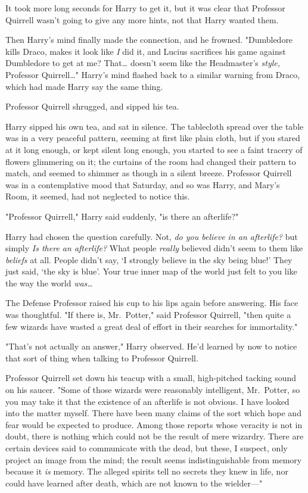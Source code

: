 It took more long seconds for Harry to get it, but it was clear that Professor
Quirrell wasn't going to give any more hints, not that Harry wanted them.

Then Harry's mind finally made the connection, and he frowned. "Dumbledore
kills Draco, makes it look like \emph{I} did it, and Lucius sacrifices his game
against Dumbledore to get at me? That{\ldots} doesn't seem like the
Headmaster's \emph{style,} Professor Quirrell{\ldots}" Harry's mind flashed
back to a similar warning from Draco, which had made Harry say the same thing.

Professor Quirrell shrugged, and sipped his tea.

Harry sipped his own tea, and sat in silence. The tablecloth spread over the
table was in a very peaceful pattern, seeming at first like plain cloth, but if
you stared at it long enough, or kept silent long enough, you started to see a
faint tracery of flowers glimmering on it; the curtains of the room had changed
their pattern to match, and seemed to shimmer as though in a silent breeze.
Professor Quirrell was in a contemplative mood that Saturday, and so was Harry,
and Mary's Room, it seemed, had not neglected to notice this.

"Professor Quirrell," Harry said suddenly, "is there an afterlife?"

Harry had chosen the question carefully. Not, \emph{do you believe in an
afterlife?} but simply \emph{Is there an afterlife?} What people \emph{really}
believed didn't seem to them like \emph{beliefs} at all. People didn't say, `I
strongly believe in the sky being blue!' They just said, `the sky is blue'.
Your true inner map of the world just felt to you like the way the world
\emph{was{\ldots}}

The Defense Professor raised his cup to his lips again before answering. His
face was thoughtful. "If there is, Mr.~Potter," said Professor Quirrell, "then
quite a few wizards have wasted a great deal of effort in their searches for
immortality."

"That's not actually an answer," Harry observed. He'd learned by now to notice
that sort of thing when talking to Professor Quirrell.

Professor Quirrell set down his teacup with a small, high-pitched tacking sound
on his saucer. "Some of those wizards were reasonably intelligent, Mr.~Potter,
so you may take it that the existence of an afterlife is not obvious. I have
looked into the matter myself. There have been many claims of the sort which
hope and fear would be expected to produce. Among those reports whose veracity
is not in doubt, there is nothing which could not be the result of mere
wizardry. There are certain devices said to communicate with the dead, but
these, I suspect, only project an image from the mind; the result seems
indistinguishable from memory because it \emph{is} memory. The alleged spirits
tell no secrets they knew in life, nor could have learned after death, which
are not known to the wielder---"

